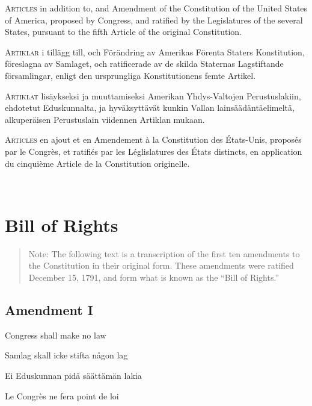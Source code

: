 \documentclass[a4,landscape,12pt]{article}
\begin{document}
\begin{minipage}[t]{0.22\textwidth}
\textsc{Articles} in addition to, and Amendment of the Constitution of the United States of America, proposed by Congress, and ratified by the Legislatures of the several States, pursuant to the fifth Article of the original Constitution.
\end{minipage}\textwidth
\begin{minipage}[t]{0.22\textwidth}
\textsc{Artiklar} i tillägg till, och Förändring av Amerikas Förenta Staters Konstitution, föreslagna av Samlaget, och ratificerade av de skilda Staternas Lagstiftande församlingar, enligt den ursprungliga Konstitutionens femte Artikel.
\end{minipage}\textwidth
\begin{minipage}[t]{0.22\textwidth}
\textsc{Artiklat} lisäykseksi ja muuttamiseksi Amerikan Yhdys-Valtojen Perustuslakiin, ehdotetut Eduskunnalta, ja hyväksyttävät kunkin Vallan lainsäädäntäelimeltä, alkuperäisen Perustuslain viidennen Artiklan mukaan.
\end{minipage}\textwidth
\begin{minipage}[t]{0.22\textwidth}
\textsc{Articles} en ajout et en Amendement à la Constitution des États-Unis, proposés par le Congrès, et ratifiés par les Léglislatures des États distincts, en application du cinquième Article de la Constitution originelle.
\end{minipage}

~

\section*{Bill of Rights}
\begin{quote}\small{}
Note: The following text is a transcription of the first ten amendments to the Constitution in their original form. These amendments were ratified December 15, 1791, and form what is known as the ``Bill of Rights.''
\end{quote}
\subsection*{Amendment I}
\begin{minipage}[t]{0.22\textwidth}
Congress shall make no law
\end{minipage}\textwidth
\begin{minipage}[t]{0.22\textwidth}
Samlag skall icke stifta någon lag
\end{minipage}\textwidth
\begin{minipage}[t]{0.22\textwidth}
Ei Eduskunnan pidä säättämän lakia
\end{minipage}\textwidth
\begin{minipage}[t]{0.22\textwidth}
Le Congrès ne fera point de loi
\end{minipage}
\end{document}
